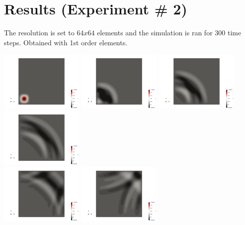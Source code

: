 \section*{Results (Experiment \# 2)}

The resolution is set to $64x64$ elements and the simulation 
is ran for 300 time steps. Obtained with 1st order elements. 

\begin{center}
\includegraphics[width=4cm]{python_codes/fieldstone_165/results2/uu0000.png}
\includegraphics[width=4cm]{python_codes/fieldstone_165/results2/uu0050.png}
\includegraphics[width=4cm]{python_codes/fieldstone_165/results2/uu0100.png}
\includegraphics[width=4cm]{python_codes/fieldstone_165/results2/uu0150.png}\\
\includegraphics[width=4cm]{python_codes/fieldstone_165/results2/uu0200.png}
\includegraphics[width=4cm]{python_codes/fieldstone_165/results2/uu0250.png}

\end{center}
